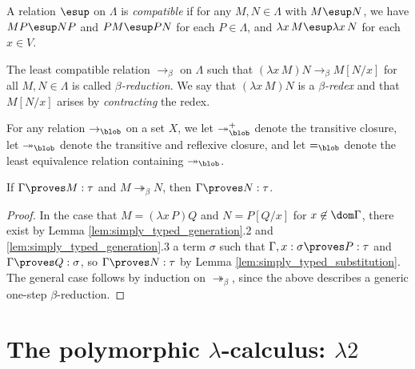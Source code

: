\documentclass[reqno]{amsart}
\begin{document}
    \begin{definition}
        A relation $\esup$ on $\Lambda$ is \textit{compatible} if for any $M,N\in\Lambda$ with $M\esup N$, we have $MP\esup NP$ and $PM\esup PN$ for each $P\in\Lambda$, and $\lambda x\,M\esup\lambda x\,N$ for each $x\in V$.
    \end{definition}

    \begin{definition}
        The least compatible relation $\rightarrow_\beta$ on $\Lambda$ such that $(\lambda x\,M)N\rightarrow_\beta M[N/x]$ for all $M,N\in\Lambda$ is called \textit{$\beta$-reduction}. We say that $(\lambda x\,M)N$ is a \textit{$\beta$-redex} and that $M[N/x]$ arises by \textit{contracting} the redex.
    \end{definition}

    \begin{notation}
        For any relation $\rightarrow_\blob$ on a set $X$, we let $\twoheadrightarrow_\blob^+$ denote the transitive closure, let $\twoheadrightarrow_\blob$ denote the transitive and reflexive closure, and let $=_\blob$ denote the least equivalence relation containing $\twoheadrightarrow_\blob$.
    \end{notation}

    \begin{theorem}
        If $\Gamma\proves M:\tau$ and $M\twoheadrightarrow_\beta N$, then $\Gamma\proves N:\tau$.
    \end{theorem}
    \begin{proof}
        In the case that $M=(\lambda x\,P)Q$ and $N=P[Q/x]$ for $x\not\in\dom\Gamma$, there exist by Lemma \ref{lem:simply_typed_generation}.2 and \ref{lem:simply_typed_generation}.3 a term $\sigma$ such that $\Gamma,x:\sigma\proves P:\tau$ and $\Gamma\proves Q:\sigma$, so $\Gamma\proves N:\tau$ by Lemma \ref{lem:simply_typed_substitution}. The general case follows by induction on $\twoheadrightarrow_\beta$, since the above describes a generic one-step $\beta$-reduction.
    \end{proof}

    \section{The polymorphic $\lambda$-calculus: $\lambda2$}

    \begin{definition}
        
    \end{definition}
\end{document}

